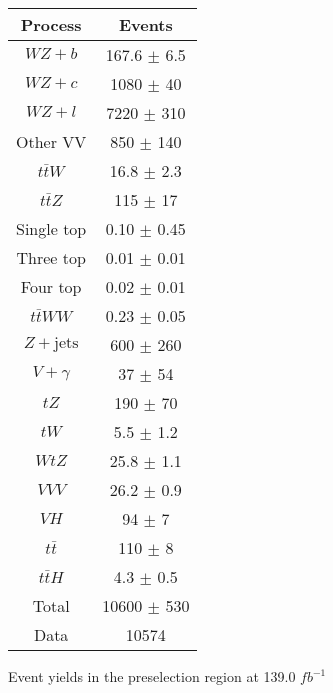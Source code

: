 \begin{center}
\begin{tabular}{|c|c|}
\hline
Process & Events \\
\hline 
  $WZ + b$   & 167.6 $\pm$ 6.5 \\
  $WZ + c$   & 1080 $\pm$ 40 \\
  $WZ + l$   & 7220 $\pm$ 310 \\
  Other VV   & 850 $\pm$ 140 \\
  $t\bar{t}W$   & 16.8 $\pm$ 2.3 \\
  $t\bar{t}Z$   & 115 $\pm$ 17 \\
  Single top   & 0.10 $\pm$ 0.45 \\
  Three top   & 0.01 $\pm$ 0.01 \\
  Four top   & 0.02 $\pm$ 0.01 \\
  $t\bar{t}WW$   & 0.23 $\pm$ 0.05 \\
  $Z+\text{jets}$   & 600 $\pm$ 260 \\
  $V+\gamma$   & 37 $\pm$ 54 \\
  $tZ$   & 190 $\pm$ 70 \\
  $tW$   & 5.5 $\pm$ 1.2 \\
  $WtZ$   & 25.8 $\pm$ 1.1 \\
  $VVV$   & 26.2 $\pm$ 0.9 \\
  $VH$   & 94 $\pm$ 7 \\
  $t\bar{t}$   & 110 $\pm$ 8 \\
  $t\bar{t}H$   & 4.3 $\pm$ 0.5 \\
\hline
  Total  & 10600 $\pm$ 530 \\
\hline
  Data   & 10574 \\
\hline 
\end{tabular} 
\caption{Event yields in the preselection region at 139.0 $fb^{-1}$} 
\end{center} 

